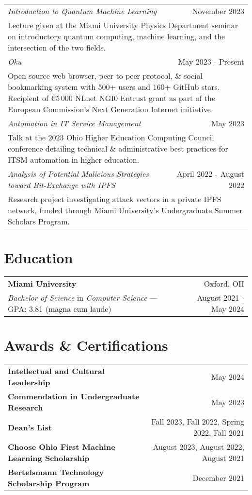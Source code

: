 \documentclass[letterpaper,10pt]{article} %
\begin{document}
\scriptsize{
\begin{tabular*}{\linewidth}{@{\extracolsep{\fill}} lr }
\emph{Introduction to Quantum Machine Learning} & November 2023\\
\multicolumn{2}{p{\linewidth}}{Lecture given at the Miami University Physics Department seminar on introductory quantum computing, machine learning, and the intersection of the two fields.}\\
\emph{Oku} & May 2023 - Present\\
\multicolumn{2}{p{\linewidth}}{Open-source web browser, peer-to-peer protocol, \& social bookmarking system with 500+ users and 160+ GitHub stars. Recipient of €5\,000 NLnet NGI0 Entrust grant as part of the European Commission's Next Generation Internet initiative.}\\
\emph{Automation in IT Service Management} & May 2023\\
\multicolumn{2}{p{\linewidth}}{Talk at the 2023 Ohio Higher Education Computing Council conference detailing technical \& administrative best practices for ITSM automation in higher education.}\\
\emph{Analysis of Potential Malicious Strategies toward Bit-Exchange with IPFS} & April 2022 - August 2022\\
\multicolumn{2}{p{\linewidth}}{Research project investigating attack vectors in a private IPFS network, funded through Miami University's Undergraduate Summer Scholars Program.}\\
\end{tabular*}}

\section{Education}
\scriptsize{
\begin{tabular*}{\linewidth}{@{\extracolsep{\fill}} lr }
\textbf{Miami University} & Oxford, OH\\
\emph{Bachelor of Science} in \emph{Computer Science} --- GPA\@: 3.81 (magna cum laude) & August 2021 - May 2024
\end{tabular*}}

\section{Awards \& Certifications}
\scriptsize{
\begin{tabular*}{\linewidth}{@{\extracolsep{\fill}} lr }
\textbf{Intellectual and Cultural Leadership} & May 2024\\
\textbf{Commendation in Undergraduate Research} & May 2023\\
\textbf{Dean's List} & Fall 2023, Fall 2022, Spring 2022, Fall 2021\\
\textbf{Choose Ohio First Machine Learning Scholarship} & August 2023, August 2022, August 2021\\
\textbf{Bertelsmann Technology Scholarship Program} & December 2021
\end{tabular*}}
\end{document}
